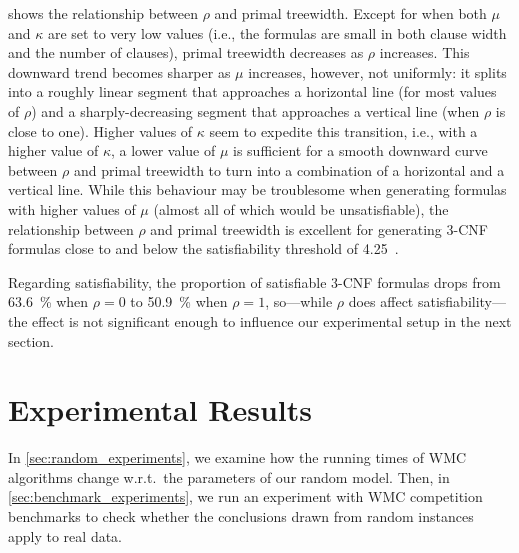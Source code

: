 \documentclass[runningheads]{llncs}
\begin{document}
 shows the relationship between $\rho$ and
primal treewidth. Except for when both $\mu$ and $\kappa$ are set to very low
values (i.e., the formulas are small in both clause width and the number of
clauses), primal treewidth decreases as $\rho$ increases. This downward trend
becomes sharper as $\mu$ increases, however, not uniformly: it splits into a
roughly linear segment that approaches a horizontal line (for most values of
$\rho$) and a sharply-decreasing segment that approaches a vertical line (when
$\rho$ is close to one). Higher values of $\kappa$ seem to expedite this
transition, i.e., with a higher value of $\kappa$, a lower value of $\mu$ is
sufficient for a smooth downward curve between $\rho$ and primal treewidth to
turn into a combination of a horizontal and a vertical line. While this
behaviour may be troublesome when generating formulas with higher values of
$\mu$ (almost all of which would be unsatisfiable), the relationship between
$\rho$ and primal treewidth is excellent for generating 3-CNF formulas close to
and below the satisfiability threshold of
4.25~\cite{DBLP:journals/ai/CrawfordA96}.

Regarding satisfiability, the proportion of satisfiable 3-CNF formulas drops
from \SI{63.6}{\percent} when $\rho = 0$ to \SI{50.9}{\percent} when $\rho = 1$,
so---while $\rho$ does affect satisfiability---the effect is not significant
enough to influence our experimental setup in the next section.


\section{Experimental Results}\label{sec:experiments}

In \cref{sec:random_experiments}, we examine how the running times of
\textsf{WMC} algorithms change w.r.t.\ the parameters of our random model. Then,
in \cref{sec:benchmark_experiments}, we run an experiment with \textsf{WMC}
competition benchmarks to check whether the conclusions drawn from random
instances apply to real data.
\end{document}
